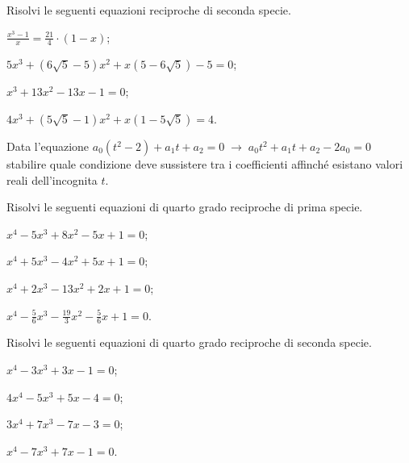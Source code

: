 \begin{esercizio}[\Ast]
\label{ese:5.44}
Risolvi le seguenti equazioni reciproche di seconda specie.
\begin{multicols}{2}
\begin{enumeratea}
\item $\frac{x^3-1} x=\frac{21} 4\cdot (1-x)$;
\item $5x^3+(6\sqrt 5-5)x^2+x(5-6\sqrt 5)-5=0$;
\item $x^3+13x^2-13x-1=0$;
\item $4x^3+(5\sqrt 5-1)x^2+x(1-5\sqrt 5)=4$.
\end{enumeratea}
\end{multicols}
\end{esercizio}

\begin{esercizio}
\label{ese:5.45}
Data l'equazione $a_0\left(t^2-2\right)+a_1t+a_2=0\;\to \;a_0t^2+a_1t+a_2-2a_0=0$ stabilire quale condizione deve sussistere tra i coefficienti affinché esistano valori reali dell'incognita $ t $.
\end{esercizio}

\begin{esercizio}[\Ast]
\label{ese:5.46}
Risolvi le seguenti equazioni di quarto grado reciproche di prima specie.
\begin{multicols}{2}
\begin{enumeratea}
\item $x^4-5x^3+8x^2-5x+1=0$;
\item $x^4+5x^3-4x^2+5x+1=0$;
\item $x^4+2x^3-13x^2+2x+1=0$;
\item $x^4-\frac 5 6x^3-\frac{19} 3x^2-\frac 5 6x+1=0$.
\end{enumeratea}
\end{multicols}
\end{esercizio}

\begin{esercizio}[\Ast]
 \label{ese:5.47}
Risolvi le seguenti equazioni di quarto grado reciproche di seconda specie.
\begin{multicols}{2}
\begin{enumeratea}
\item $x^4-3x^3+3x-1=0$;
\item $4x^4-5x^3+5x-4=0$;
\item $3x^4+7x^3-7x-3=0$;
\item $x^4-7x^3+7x-1=0$.
\end{enumeratea}
\end{multicols}
\end{esercizio}

